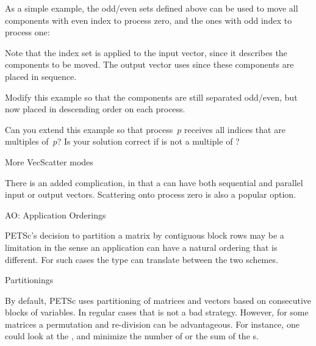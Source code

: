 As a simple example, the odd/even sets defined above can be used to
move all components with even index to process zero, and the ones with
odd index to process one:
%

Note that the index set is applied to the input vector, since it
describes the components to be moved. The output vector uses
 since these components are placed in sequence.

\begin{exercise}
  Modify this example so that the components are still separated
  odd/even, but now placed in descending order on each process.
\end{exercise}

\begin{exercise}
  Can you extend this example so that process~$p$ receives
  all indices that are multiples of~$p$? Is your solution correct if
   is not a multiple of ?
\end{exercise}

 {More VecScatter modes}

There is an added complication, in that a  can
have both sequential and parallel input or output vectors.
Scattering onto process zero is also a popular option.

 {AO: Application Orderings}

PETSc's decision to partition a matrix by contiguous block rows
may be a limitation in the sense an application can have a natural
ordering that is different. For such cases the  type
can translate between the two schemes.

 {Partitionings}

By default, PETSc uses partitioning of matrices and vectors based on
consecutive blocks of variables.
In regular cases that is not a bad strategy.
However, for some matrices a permutation and re-division can
be advantageous.
For instance, one could look at the ,
and minimize the number of 
or the sum of the s.

